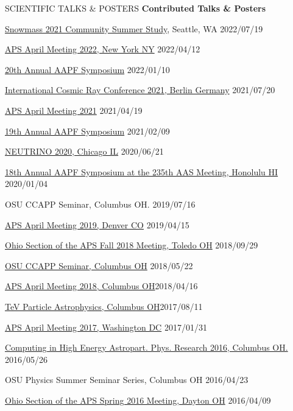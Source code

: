 \documentclass{resume} %
\begin{document}
\begin{rSection}{SCIENTIFIC TALKS \& POSTERS}
{\bf Contributed Talks \& Posters}
\begin{etaremune}
\item \href{https://indico.fnal.gov/event/22303/contributions/245833/}{Snowmass 2021 Community Summer Study}, Seattle, WA  \hfill 2022/07/19
\item \href{https://meetings.aps.org/Meeting/APR22/Session/Y09.1}{APS April Meeting 2022, New York NY} \hfill 2022/04/12
\item \href{https://aapf-fellows.org/symposium/2022}{20th Annual AAPF Symposium} \hfill 2022/01/10
\item \href{https://indico.desy.de/event/27991/contributions/102162/}{International Cosmic Ray Conference 2021, Berlin Germany} \hfill 2021/07/20
\item \href{http://meetings.aps.org/Meeting/APR21/Session/T18}{APS April Meeting 2021} \hfill 2021/04/19
\item \href{https://sites.google.com/view/aapf2021/schedule}{19th Annual AAPF Symposium} \hfill 2021/02/09
\item \href{https://indico.fnal.gov/event/19348/contributions/186681/}{NEUTRINO 2020, Chicago IL} \hfill 2020/06/21
\item \href{https://aapf-fellows.org/symposium/2020#BrianClark}{18th Annual AAPF Symposium at the 235th AAS Meeting, Honolulu HI} \hfill 2020/01/04
\item OSU CCAPP Seminar, Columbus OH. \hfill 2019/07/16
\item \href{http://meetings.aps.org/Meeting/APR19/Session/R08.4}{APS April Meeting 2019, Denver CO} \hfill 2019/04/15
\item \href{http://meetings.aps.org/Meeting/OSF18/Session/A01.2}{Ohio Section of the APS Fall 2018 Meeting, Toledo OH} \hfill 2018/09/29
\item \href{http://ccapp.osu.edu/pastseminars.html#past}{OSU CCAPP Seminar, Columbus OH} \hfill 2018/05/22
\item \href{http://meetings.aps.org/Meeting/APR18/Session/U17.7}{APS April Meeting 2018, Columbus OH}\hfill 2018/04/16
\item \href{http://indico.cern.ch/event/615891/contributions/2648790/}{TeV Particle Astrophysics, Columbus OH}\hfill 2017/08/11
\item \href{http://meetings.aps.org/Meeting/APR17/Session/Y3.2}{APS April Meeting 2017, Washington DC} \hfill 2017/01/31
\item \href{http://ccapp.osu.edu/workshops/CHEAPR2016/workshop.html}{Computing in High Energy Astropart. Phys. Research 2016, Columbus OH.} \hfill 2016/05/26
\item OSU Physics Summer Seminar Series, Columbus OH \hfill 2016/04/23
\item \href{http://meetings.aps.org/Meeting/OSS16/Session/D3.6}{Ohio Section of the APS Spring 2016 Meeting, Dayton OH} \hfill 2016/04/09

\end{etaremune}
\end{rSection}
\newpage
\end{document}
